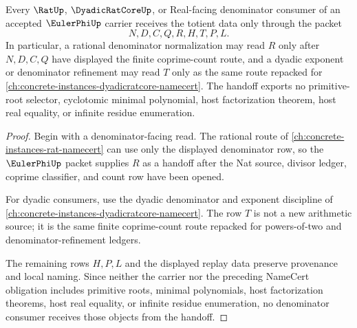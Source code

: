 \begin{theorem}
\label{thm:euler-phi-coprime-denominator-handoff}
Every $\RatUp$, $\DyadicRatCoreUp$, or Real-facing denominator consumer of an accepted $\EulerPhiUp$ carrier receives the totient data only through the packet
$$
N,D,C,Q,R,H,T,P,L.
$$
In particular, a rational denominator normalization may read $R$ only after $N,D,C,Q$ have displayed the finite coprime-count route, and a dyadic exponent or denominator refinement may read $T$ only as the same route repacked for \autoref{ch:concrete-instances-dyadicratcore-namecert}. The handoff exports no primitive-root selector, cyclotomic minimal polynomial, host factorization theorem, host real equality, or infinite residue enumeration.
\end{theorem}
\begin{proof}
Begin with a denominator-facing read. The rational route of \autoref{ch:concrete-instances-rat-namecert} can use only the displayed denominator row, so the $\EulerPhiUp$ packet supplies $R$ as a handoff after the Nat source, divisor ledger, coprime classifier, and count row have been opened.

For dyadic consumers, use the dyadic denominator and exponent discipline of \autoref{ch:concrete-instances-dyadicratcore-namecert}. The row $T$ is not a new arithmetic source; it is the same finite coprime-count route repacked for powers-of-two and denominator-refinement ledgers.

The remaining rows $H,P,L$ and the displayed replay data preserve provenance and local naming. Since neither the carrier nor the preceding NameCert obligation includes primitive roots, minimal polynomials, host factorization theorems, host real equality, or infinite residue enumeration, no denominator consumer receives those objects from the handoff.
\end{proof}


\begin{closurestatus}{\EulerPhiUp}
  \theoryclosure{\seedClosure}
  \formalstatus{\formalTargetV}
\end{closurestatus}

